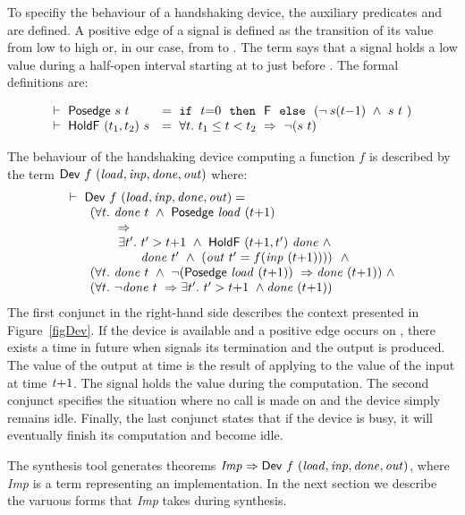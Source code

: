 To specifiy the behaviour of a handshaking device,
the auxiliary predicates  and  are defined.
A positive edge of a signal is defined as the transition of its
value from low to high or, in our case, from  to . 
The term  says that a
signal  holds a low value  during a half-open interval
starting at  to just before . The formal definitions are:

\[
\begin{array}{ll}
\vdash\ \mathsf{Posedge}\ s\ t~ &      = ~ \texttt{if}~~t{=}0~~\texttt{then}~~\mathsf{F}~~\texttt{else}~~(\neg\hspace*{0.8mm} s(t{-}1)\ \wedge\ s\ t~)\\
\vdash\ \mathsf{HoldF}\ (t_1,t_2)\ s & = ~ \forall t.\ t_1 \leq t < t_2\ \Rightarrow\ \neg(s\ t)
\end{array}
\]



The behaviour of the handshaking device computing a function $f$ is described by the term 
$\DEF{Dev}\ f\ \VAR{(load,inp,done,out)}$ where:
\[
\begin{array}{l}
\TURNST\ \DEF{Dev}\ f\ \VAR{(load,inp,done,out)} = \\
~~\quad     (\forall t.\ \VAR{done}\ t\ \AND\ \DEF{Posedge}\ \VAR{load}\ (t{+}1)\ \\
\phantom{~~\quad     (\forall t.~} \IMP \\
\phantom{~~\quad     (\forall t.\ ~ } \exists t'.\ t' > t{+}1\ \AND\ \DEF{HoldF}\ (t{+}1,t')\ \VAR{done}\ \AND \\
\phantom{~~\quad     (\forall t.\ ~ \exists t'.\ }  \VAR{done}\ t'\ \AND\ (\VAR{out}\ t' = f (\VAR{inp}\ (t{+}1))))\ ~  \AND \\
~~\quad (\forall t.\ \VAR{done}\ t\ \AND\ \NOT(\DEF{Posedge}\ \VAR{load}\ (t{+}1))\ \IMP  \VAR{done}\ (t{+}1)) ~\AND \\
~~\quad (\forall t.\ \NOT\VAR{done}\ t\ \IMP \exists t'.\ t' > t{+}1\ \AND \VAR{done}\ (t{+}1))\\
\end{array}
\]
The first conjunct in the right-hand side describes the context presented
in Figure~\ref{figDev}. If the device is available and a positive
edge occurs on , there exists a time  in future
when  signals its termination and the output is produced.
The value of the output at time  is the result
of applying  to the value of the input at time $\mathit{t}{+}1$.
The signal  holds the value  during the computation.
The second conjunct specifies the situation where no call
is made on  and the device simply remains idle.
Finally, the last conjunct states that if the device
is busy, it will eventually finish its computation
and become idle.

The synthesis tool generates theorems ${\it{Imp}}
\Rightarrow \mathsf{Dev}\ f\ \mathit{(load,inp,done,out)}$, where {\it{Imp}}
is a term representing an implementation. In the next section we
describe the varuous forms that {\it{Imp}} takes during synthesis.
